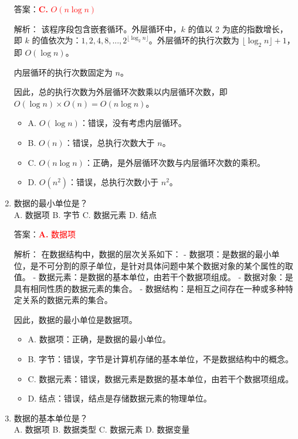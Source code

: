 \documentclass[lang=cn,newtx,10pt,scheme=chinese]{../../../elegantbook}
\begin{document}
\begin{enumerate}
    答案：\textcolor{red}{\textbf{C.} $O(n \log n)$}

    解析：
    该程序段包含嵌套循环。外层循环中，$k$ 的值以 2 为底的指数增长，即 $k$ 的值依次为：$1, 2, 4, 8, ..., 2^{\lfloor\log_2 n\rfloor}$。外层循环的执行次数为 $\lfloor\log_2 n\rfloor + 1$，即 $O(\log n)$。
    
    内层循环的执行次数固定为 $n$。
    
    因此，总的执行次数为外层循环次数乘以内层循环次数，即 $O(\log n) \times O(n) = O(n \log n)$。

    \begin{itemize}
        \item A. $O(\log n)$：错误，没有考虑内层循环。
        \item B. $O(n)$：错误，总执行次数大于 $n$。
        \item C. $O(n \log n)$：正确，是外层循环次数与内层循环次数的乘积。
        \item D. $O(n^2)$：错误，总执行次数小于 $n^2$。
    \end{itemize}

    \item 数据的最小单位是？\\
    A. 数据项 \quad B. 字节 \quad C. 数据元素 \quad D. 结点

    答案：\textcolor{red}{\textbf{A.} 数据项}

    解析：
    在数据结构中，数据的层次关系如下：
    - 数据项：是数据的最小单位，是不可分割的原子单位，是针对具体问题中某个数据对象的某个属性的取值。
    - 数据元素：是数据的基本单位，由若干个数据项组成。
    - 数据对象：是具有相同性质的数据元素的集合。
    - 数据结构：是相互之间存在一种或多种特定关系的数据元素的集合。

    因此，数据的最小单位是数据项。

    \begin{itemize}
        \item A. 数据项：正确，是数据的最小单位。
        \item B. 字节：错误，字节是计算机存储的基本单位，不是数据结构中的概念。
        \item C. 数据元素：错误，数据元素是数据的基本单位，由若干个数据项组成。
        \item D. 结点：错误，结点是存储数据元素的物理单位。
    \end{itemize}

    \item 数据的基本单位是？\\
    A. 数据项 \quad B. 数据类型 \quad C. 数据元素 \quad D. 数据变量


\end{enumerate}
\end{document}

